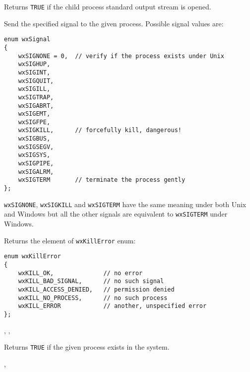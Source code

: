Returns {\tt TRUE} if the child process standard output stream is opened.

\label{wxprocesskill}


Send the specified signal to the given process. Possible signal values are:

\begin{verbatim}
enum wxSignal
{
    wxSIGNONE = 0,  // verify if the process exists under Unix
    wxSIGHUP,
    wxSIGINT,
    wxSIGQUIT,
    wxSIGILL,
    wxSIGTRAP,
    wxSIGABRT,
    wxSIGEMT,
    wxSIGFPE,
    wxSIGKILL,      // forcefully kill, dangerous!
    wxSIGBUS,
    wxSIGSEGV,
    wxSIGSYS,
    wxSIGPIPE,
    wxSIGALRM,
    wxSIGTERM       // terminate the process gently
};
\end{verbatim}

{\tt wxSIGNONE}, {\tt wxSIGKILL} and {\tt wxSIGTERM} have the same meaning
under both Unix and Windows but all the other signals are equivalent to
{\tt wxSIGTERM} under Windows.

Returns the element of {\tt wxKillError} enum:

\begin{verbatim}
enum wxKillError
{
    wxKILL_OK,              // no error
    wxKILL_BAD_SIGNAL,      // no such signal
    wxKILL_ACCESS_DENIED,   // permission denied
    wxKILL_NO_PROCESS,      // no such process
    wxKILL_ERROR            // another, unspecified error
};
\end{verbatim}


,\rtfsp
{},\rtfsp
{}

\label{wxprocessexists}


Returns {\tt TRUE} if the given process exists in the system.


,\rtfsp
{}

\label{wxprocessonterminate}


